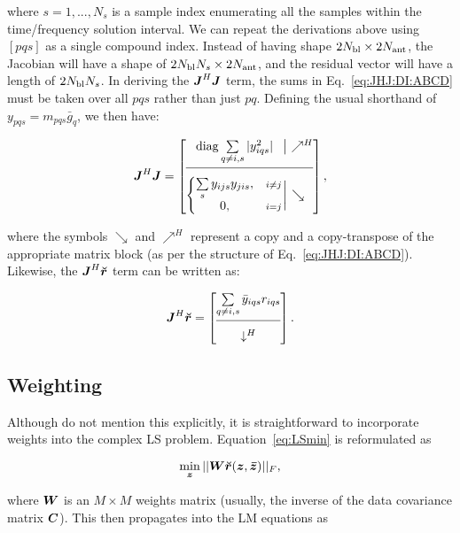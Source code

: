 \documentclass[useAMS,usenatbib]{mn2e}
\makeatletter
\newcommand{\mat}[1]{{\bmath{#1}}}
\newcommand{\JJ}{\mat{J}} %
\newcommand{\JHJ}{\JJ^H\JJ} %
\newcommand{\Matrix}[2]{\left [ \begin{array}{@{}#1@{}}#2\end{array} \right ]}
\newcommand{\AUG}[1]{\bmath{\breve{#1}}}
\newcommand{\Rr}{\AUG{r}}
\makeatother
\begin{document}
where $s=1,...,N_s$ is a sample index enumerating all the samples within the 
time/frequency solution interval. We can repeat the derivations above using  $[pqs]$ as a
single compound index. Instead of having shape $2N_\mathrm{bl}\times2N_\mathrm{ant}$, the Jacobian 
will have a shape of $2N_\mathrm{bl}N_s\times 2N_\mathrm{ant}$, and the residual vector will have a length of 
$2N_\mathrm{bl}N_s$. In deriving the $\JHJ$ term, the sums in Eq.~\ref{eq:JHJ:DI:ABCD} must be taken over all $pqs$ 
rather than just $pq$. Defining the usual shorthand of 
$y_{pqs}=m_{pqs}\bar{g}_q$, we then have:

\begin{equation}
\label{eq:JHJ:DI:tf}
\JJ^H \JJ = 
\JHJblocks{
  \mathrm{diag} \sum\limits_{q\ne i,s} |y^2_{iqs}| 
}{
  \left \{ 
  \begin{array}{@{}cc@{}}
   \sum\limits_{s} y_{ijs}y_{jis},&{\scriptstyle i\ne j} \\
   0, &{\scriptstyle i=j}
  \end{array} \right . 
},
\end{equation}

where the symbols $\searrow$ and $\nearrow^H$ represent a copy and a copy-transpose of the appropriate matrix block (as per the structure of Eq.~\ref{eq:JHJ:DI:ABCD}). Likewise, the $\JJ^H\Rr$ term can be written as:

\begin{equation}
\label{eq:JHR:DI:tf}
\JJ^H\Rr 
= \Matrix{c}{
\sum\limits_{q\ne i,s} \bar{y}_{iqs} r_{iqs}   \\
 \hline \\[-8pt]
\downarrow^H
}.
\end{equation}

\subsection{Weighting}
\label{sec:DI:W}

Although \citet{ComplexOpt} do not mention this explicitly, it is straightforward to incorporate weights into the 
complex LS problem. Equation~\ref{eq:LSmin} is reformulated as

\begin{equation}
\label{eq:LSmin:w}
\min_{\bmath{z}} ||\mat{W} \Rr(\bmath{z},\bmath{\bar z})||_F,
\end{equation}

where $\mat{W}$ is an $M\times M$ weights matrix (usually, the inverse of the data covariance matrix $\mat{C}$). This then propagates into the LM equations as
\end{document}
